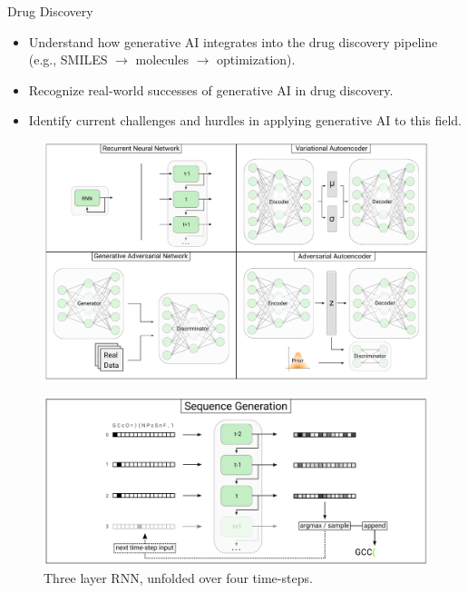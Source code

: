 \begin{frame}[allowframebreaks]{Drug Discovery}
    \framebreak
    
    \begin{itemize}
        \item Understand how generative AI integrates into the drug discovery pipeline (e.g., SMILES $\rightarrow$ molecules $\rightarrow$ optimization).
        \item Recognize real-world successes of generative AI in drug discovery.
        \item Identify current challenges and hurdles in applying generative AI to this field.
    \end{itemize}

    \framebreak

    \begin{figure}
        \centering
        \includegraphics[height=0.9\textheight,width=1\textwidth,keepaspectratio]{images/science/drug-discovery-architecture.png}
    \end{figure}

    \framebreak

    \begin{figure}
        \centering
        \includegraphics[height=0.8\textheight,width=1\textwidth,keepaspectratio]{images/science/drug-discovery-sequence-gen.png}
        \caption*{Three layer RNN, unfolded over four time-steps.}
    \end{figure}


\end{frame}
